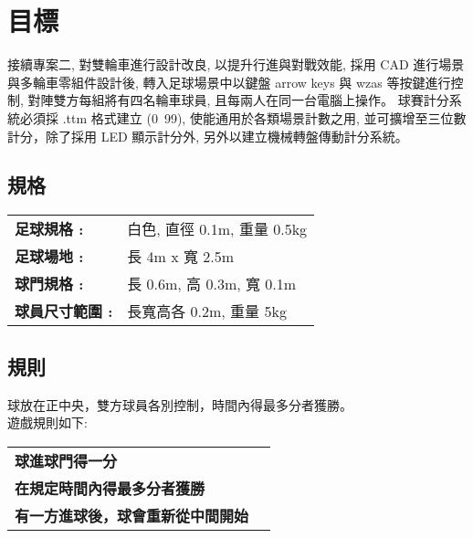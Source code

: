 \chapter{目標}
接續專案二, 對雙輪車進行設計改良, 以提升行進與對戰效能, 採用 CAD 進行場景與多輪車零組件設計後, 轉入足球場景中以鍵盤 arrow keys 與 wzas 等按鍵進行控制, 對陣雙方每組將有四名輪車球員, 且每兩人在同一台電腦上操作。
球賽計分系統必須採 .ttm 格式建立 (0~99), 使能通用於各類場景計數之用, 並可擴增至三位數計分，除了採用 LED 顯示計分外, 另外以建立機械轉盤傳動計分系統。

\section{規格}
\begin{tabular}{p{8cm}p{}}
  \textbf{足球規格 :} & 白色, 直徑 0.1m, 重量 0.5kg \\
  \textbf{足球場地 :} & 長 4m x 寬 2.5m \\
  \textbf{球門規格 :} & 長 0.6m, 高 0.3m, 寬 0.1m \\
  \textbf{球員尺寸範圍 :} & 長寬高各 0.2m, 重量 5kg \\
\end{tabular}

\section{規則}
球放在正中央，雙方球員各別控制，時間內得最多分者獲勝。 \\
遊戲規則如下:
\begin{tabular}{p{8cm}p{}}
  \textbf{球進球門得一分}\\
  \textbf{在規定時間內得最多分者獲勝}\\
  \textbf{有一方進球後，球會重新從中間開始}\\
\end{tabular}

